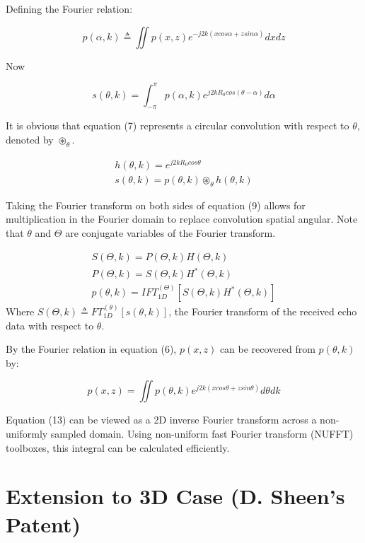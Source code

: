\documentclass{IEEEtran}
\begin{document}
Defining the Fourier relation:

\begin{equation}
p(\alpha,k) \triangleq \iint p(x,z) e^{-j2k(xcos\alpha+zsin\alpha)}dxdz
\end{equation}

Now

\begin{equation}
s(\theta,k) = \int_{-\pi}^{\pi} p(\alpha,k) e^{j2kR_0cos(\theta-\alpha)}d\alpha
\end{equation}

It is obvious that equation (7) represents a circular convolution with respect to $\theta$, denoted by $\circledast_{\theta}$.

\begin{gather}
h(\theta,k) = e^{j2kR_0cos\theta}\\
s(\theta,k) = p(\theta,k) \circledast_{\theta} h(\theta,k)
\end{gather}

Taking the Fourier transform on both sides of equation (9) allows for multiplication in the Fourier domain to replace convolution spatial angular. Note that $\theta$ and $\Theta$ are conjugate variables of the Fourier transform.

\begin{gather}
S(\Theta,k) = P(\Theta,k)H(\Theta,k) \\
P(\Theta,k) = S(\Theta,k)H^*(\Theta,k) \\
p(\theta,k) = IFT_{1D}^{(\Theta)}\left[ S(\Theta,k)H^*(\Theta,k) \right]
\end{gather}
Where $S(\Theta,k) \triangleq FT_{1D}^{(\theta)}[s(\theta,k)]$, the Fourier transform of the received echo data with respect to $\theta$.

By the Fourier relation in equation (6), $p(x,z)$ can be recovered from $p(\theta,k)$ by:

\begin{equation}
p(x,z) = \iint p(\theta,k) e^{j2k(xcos\theta+zsin\theta)}d\theta dk
\end{equation}

Equation (13) can be viewed as a 2D inverse Fourier transform across a non-uniformly sampled domain. Using non-uniform fast Fourier transform (NUFFT) toolboxes, this integral can be calculated efficiently. 

\section{Extension to 3D Case (D. Sheen's Patent)}
\end{document}

